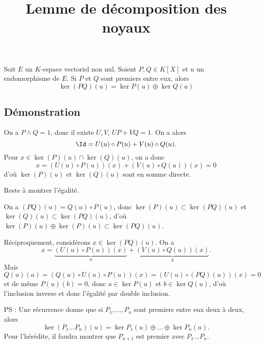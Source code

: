 \documentclass[fontsize=12pt,twoside=false,parskip=half, french]{scrartcl}
\title{Lemme de décomposition des noyaux}
\date{}
\author{}
\begin{document}
\maketitle
   \begin{Theoreme}
      Soit $E$ un $K$-espace vectoriel non nul. Soient $P, Q \in K[X]$ et 
      $u$ un endomorphisme de $E$. Si $P$ et $Q$ sont premiers entre eux, alors
      \[
        \ker(PQ)(u) = \ker P(u) \oplus \ker Q(u)
      \]
   \end{Theoreme}
   \subsection{Démonstration}
      On a $P \wedge Q = 1$, donc il existe $U, V$, $UP + VQ = 1$. On a alors
      \[
         \Id = U(u) \circ P(u) + V(u) \circ Q(u). 
      \]
      Pour $x \in \ker(P)(u) \cap \ker(Q)(u)$, on a donc
      \[
         x = \left(U(u) \circ P(u)\right)(x) + \left(V(u) \circ Q(u)\right)(x) = 0
      \]
      d'où $\ker(P)(u)$ et $\ker(Q)(u)$ sont en somme directe.
      
      Reste à montrer l'égalité. 
      
      On a $(PQ)(u) = Q(u) \circ P(u)$, donc $\ker(P)(u) \subset \ker(PQ)(u)$
      et $\ker(Q)(u) \subset \ker(PQ)(u)$, d'où 
      $\ker(P)(u) \oplus \ker(P)(u) \subset \ker(PQ)(u)$.
      
      Réciproquement, considérons $x \in \ker(PQ)(u)$. On a
      \[
        x =  \underbrace{\left(U(u) \circ P(u)\right)(x)}_{a} + 
             \underbrace{\left(V(u) \circ Q(u)\right)(x)}_{b}.
      \]
      Mais
      \[
        Q(u)(a) = \left(Q(u) \circ U(u) \circ P(u)\right)(x) = 
                  \left(U(u) \circ (PQ)(u)\right)(x) = 0
      \]
      et de même $P(u)(b) = 0$, donc $a \in \ker P(u)$ et $b \in \ker Q(u)$,
      d'où l'inclusion inverse et donc l'égalité par double inclusion.
      
      PS : Une récurrence donne que si $P_1, \ldots, P_n$ sont premiers
      entre eux deux à deux, alors
      \[
         \ker(P_1\ldots P_n)(u) = \ker P_1(u) \oplus \ldots \oplus \ker P_n(u).
      \]
      Pour l'hérédite, il faudra montrer que $P_{n + 1}$ est premier avec
      $P_1\ldots P_n$. 
\end{document}
